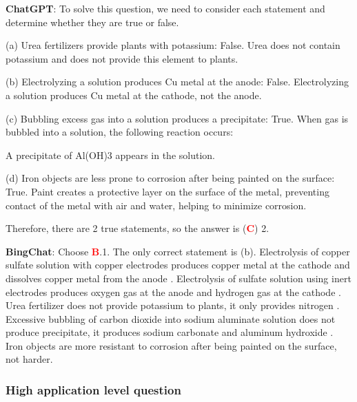 \documentclass{article}
\begin{document}
{\begin{mdframed}[linewidth=1pt,linecolor=red]
		\textbf{ChatGPT}: 
		To solve this question, we need to consider each statement and determine whether they are true or false.
		
		(a) Urea fertilizers provide plants with potassium: False. Urea does not contain potassium and does not provide this element to plants.
		
		(b) Electrolyzing a  solution produces Cu metal at the anode: False. Electrolyzing a  solution produces Cu metal at the cathode, not the anode.
		
		(c) Bubbling excess  gas into a  solution produces a precipitate: True. When  gas is bubbled into a  solution, the following reaction occurs:
		
		A precipitate of Al(OH)3 appears in the solution.
		
		(d) Iron objects are less prone to corrosion after being painted on the surface: True. Paint creates a protective layer on the surface of the metal, preventing contact of the metal with air and water, helping to minimize corrosion.
		
		Therefore, there are 2 true statements, so the answer is (\textcolor{red}{\textbf{C}}) 2.
		
		
		
		\textbf{BingChat}: Choose \textcolor{red}{\textbf{B}}.1. The only correct statement is (b). Electrolysis of copper sulfate solution with copper electrodes produces copper metal at the cathode and dissolves copper metal from the anode . Electrolysis of sulfate solution using inert electrodes produces oxygen gas at the anode and hydrogen gas at the cathode . Urea fertilizer does not provide potassium to plants, it only provides nitrogen . Excessive bubbling of carbon dioxide into sodium aluminate solution does not produce precipitate, it produces sodium carbonate and aluminum hydroxide . Iron objects are more resistant to corrosion after being painted on the surface, not harder. 
		
		
		
	\end{mdframed}	
	
	\subsubsection{High application level question}
	\label{VNHSGE_Che_H}
	
}
\end{document}
